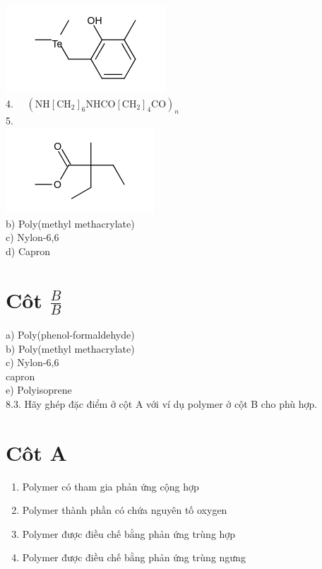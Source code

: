 \documentclass[10pt]{article}
\begin{document}
\includegraphics{smile-6de4c5775daa69ec968e49b913836da06a23e61e}\\
4. $\quad\left(\mathrm{NH}\left[\mathrm{CH}_{2}\right]_{6} \mathrm{NHCO}\left[\mathrm{CH}_{2}\right]_{4} \mathrm{CO}\right)_{n}$\\
5.\\
\includegraphics{smile-bba4c2c0db5658f9cca3f2d10ca7bb9942bf1d8d}\\
b) Poly(methyl methacrylate)\\
c) Nylon-6,6\\
d) Capron

\section*{Côt $\frac{B}{B}$}
a) Poly(phenol-formaldehyde)\\
b) Poly(methyl methacrylate)\\
c) Nylon-6,6\\
capron\\
e) Polyisoprene\\
8.3. Hãy ghép đặc điểm ở cột A với ví dụ polymer ở cột B cho phù hợp.

\section*{Côt A}
\begin{enumerate}
  \item Polymer có tham gia phản ứng cộng hợp
  \item Polymer thành phần có chứa nguyên tố oxygen
  \item Polymer được điều chế bằng phản ứng trùng hợp
  \item Polymer được điều chế bằng phản ứng trùng ngưng
\end{enumerate}
\end{document}
